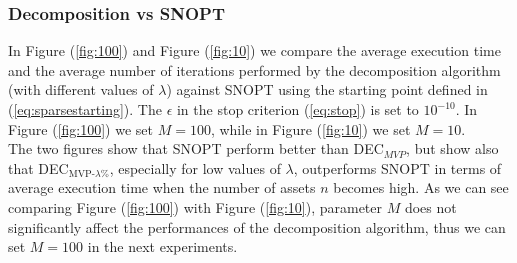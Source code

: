 \subsubsection{Decomposition vs SNOPT}
In Figure (\ref{fig:100}) and Figure (\ref{fig:10}) we compare the average execution time and the average number of iterations performed by the decomposition algorithm (with different values of $\lambda$) against SNOPT using the starting point defined in (\ref{eq:sparsestarting}). The $\epsilon$ in the stop criterion (\ref{eq:stop}) is set to $10^{-10}$. In Figure (\ref{fig:100}) we set $M=100$, while in Figure (\ref{fig:10}) we set $M=10$.\\ The two figures show that SNOPT perform better than DEC$_{MVP}$, but show also that DEC$_{\text{MVP-}\lambda\%}$, especially for low values of $\lambda$, outperforms SNOPT in terms of average execution time when the number of assets $n$ becomes high. As we can see comparing Figure (\ref{fig:100}) with Figure (\ref{fig:10}), parameter $M$ does not significantly affect the performances of the decomposition algorithm, thus we can set $M=100$ in the next experiments.
